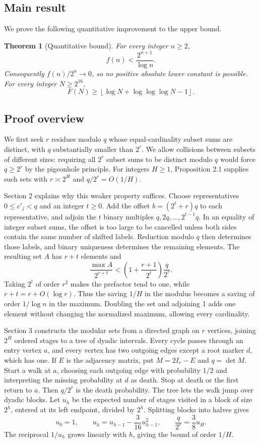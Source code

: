 \documentclass[reqno]{amsart}
\newtheorem{theorem}{Theorem}[section]
\theoremstyle{remark}
\numberwithin{equation}{section}
\begin{document}
\subsection{Main result}

We prove the following quantitative improvement to the upper bound.

\begin{theorem}[Quantitative bound]
For every integer $n\geq 2$,
\[
f(n)<\frac{2^{n+1}}{\log n}.
\]
Consequently $f(n)/2^n\to 0$, so no positive absolute lower constant is possible.  For every
integer $N\geq 2^{16}$,
\[
F(N)\geq \left\lfloor\log N+\log\log\log N-1\right\rfloor.
\]
\end{theorem}

\subsection{Proof overview}

We first seek $r$ residues modulo $q$ whose equal-cardinality subset sums are distinct, with
$q$ substantially smaller than $2^r$.  We allow collisions between subsets of different sizes:
requiring all $2^r$ subset sums to be distinct modulo $q$ would force $q\geq 2^r$ by the
pigeonhole principle.  For integers $H\geq 1$, Proposition 2.1 supplies such sets with
$r\asymp 2^H$ and $q/2^r=O(1/H)$.

Section 2 explains why this weaker property suffices.  Choose representatives $0\leq c'_j<q$
and an integer $t\geq 0$.  Add the offset $b=(2^t+r)q$ to each representative, and adjoin the
$t$ binary multiples $q,2q,\ldots,2^{t-1}q$.  In an equality of integer subset sums, the offset
is too large to be cancelled unless both sides contain the same number of shifted labels.
Reduction modulo $q$ then determines those labels, and binary uniqueness determines the remaining
elements.  The resulting set $A$ has $r+t$ elements and
\[
\frac{\max A}{2^{r+t}}<\left(1+\frac{r+1}{2^t}\right)\frac{q}{2^r}.
\]
Taking $2^t$ of order $r^2$ makes the prefactor tend to one, while $r+t=r+O(\log r)$.  Thus
the saving $1/H$ in the modulus becomes a saving of order $1/\log n$ in the maximum.  Doubling
the set and adjoining 1 adds one element without changing the normalized maximum, allowing every
cardinality.

Section 3 constructs the modular sets from a directed graph on $r$ vertices, joining $2^H$
ordered stages to a tree of dyadic intervals.  Every cycle passes through an entry vertex $a$,
and every vertex has two outgoing edges except a root marker $d$, which has one.  If $E$ is the
adjacency matrix, put $M=2I_r-E$ and $q=\det M$.  Start a walk at $a$, choosing each outgoing
edge with probability $1/2$ and interpreting the missing probability at $d$ as death.  Stop at
death or the first return to $a$.  Then $q/2^r$ is the death probability.  The tree lets the walk
jump over dyadic blocks.  Let $u_h$ be the expected number of stages visited in a block of size
$2^h$, entered at its left endpoint, divided by $2^h$.  Splitting blocks into halves gives
\[
u_0=1,\qquad u_h=u_{h-1}-\frac{3}{16}u_{h-1}^2,\qquad
\frac{q}{2^r}=\frac{3}{8}u_H.
\]
The reciprocal $1/u_h$ grows linearly with $h$, giving the bound of order $1/H$.
\end{document}
